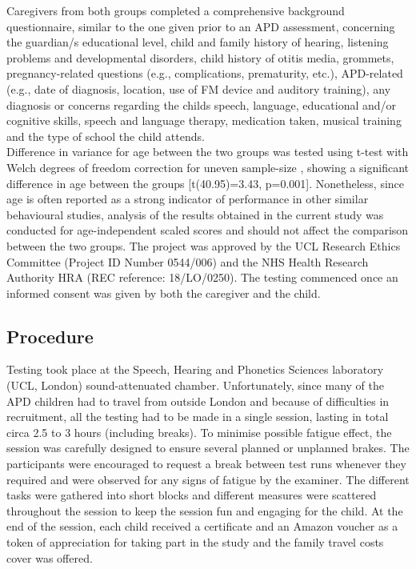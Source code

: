 \documentclass[a4paper, twoside]{templates/ociamthesis}
\begin{document}
Caregivers from both groups completed a comprehensive background questionnaire, similar to the one given prior to an APD assessment, concerning the guardian/s educational level, child and family history of hearing, listening problems and developmental disorders, child history of otitis media, grommets, pregnancy-related questions (e.g., complications, prematurity, etc.), APD-related (e.g., date of diagnosis, location, use of FM device and auditory training), any diagnosis or concerns regarding the childs speech, language, educational and/or cognitive skills, speech and language therapy, medication taken, musical training and the type of school the child attends.\\

Difference in variance for age between the two groups was tested using t-test with Welch degrees of freedom correction for uneven sample-size \autocite[independent-samples with bootstrapping n=9999; MKinfer package;][]{MKinferPackageR}, showing a significant difference in age between the groups {[}t(40.95)=3.43, p=0.001{]}. Nonetheless, since age is often reported as a strong indicator of performance in other similar behavioural studies, analysis of the results obtained in the current study was conducted for age-independent scaled scores and should not affect the comparison between the two groups. The project was approved by the UCL Research Ethics Committee (Project ID Number 0544/006) and the NHS Health Research Authority HRA (REC reference: 18/LO/0250). The testing commenced once an informed consent was given by both the caregiver and the child.

\hypertarget{procedure}{%
\subsection{Procedure}\label{procedure}}

Testing took place at the Speech, Hearing and Phonetics Sciences laboratory (UCL, London) sound-attenuated chamber. Unfortunately, since many of the APD children had to travel from outside London and because of difficulties in recruitment, all the testing had to be made in a single session, lasting in total circa 2.5 to 3 hours (including breaks). To minimise possible fatigue effect, the session was carefully designed to ensure several planned or unplanned brakes. The participants were encouraged to request a break between test runs whenever they required and were observed for any signs of fatigue by the examiner. The different tasks were gathered into short blocks and different measures were scattered throughout the session to keep the session fun and engaging for the child. At the end of the session, each child received a certificate and an Amazon voucher as a token of appreciation for taking part in the study and the family travel costs cover was offered.\\
\end{document}
